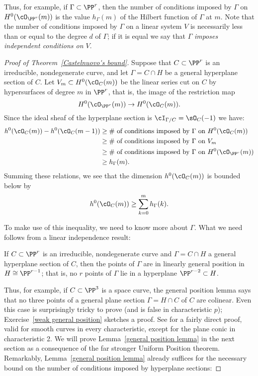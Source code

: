 Thus, for example, if $\Gamma \subset \PP^r$, then the number of conditions imposed by $\Gamma$ on $H^0(\cO_{\PP^r}(m))$ is the value $h_\Gamma(m)$ of the Hilbert function of $\Gamma$ at $m$.
Note that the number of conditions imposed by $\Gamma$ on a linear system $V$ is necessarily less than or equal to the degree $d$ of $\Gamma$; if it is equal we say that $\Gamma$ \emph{imposes independent conditions on $V$}.

\begin{proof}[Proof of Theorem~\ref{Castelnuovo's bound}]
Suppose that $C \subset \PP^r$ is an irreducible, nondegenerate curve, and let $\Gamma = C \cap H$ be a general hyperplane section of $C$. Let $V_m \subset H^0(\cO_C(m))$ be the linear series cut on $C$ by hypersurfaces of degree $m$ in $\PP^r$, that is, the image of the restriction map
$$
H^0(\cO_{\PP^r}(m)) \to H^0(\cO_C(m)).
$$
Since the ideal sheaf of the hyperplane section is $\cI_{\Gamma/C} = \sO_C(-1)$ we have:
\begin{align*}
h^0(\cO_C(m)) - h^0(\cO_C(m-1)) & \geq \text{\# of conditions imposed by $\Gamma$ on $H^0(\cO_C(m))$} \\
&\geq \text{\# of conditions imposed by $\Gamma$ on $V_m$} \\
&\geq \text{\# of conditions imposed by $\Gamma$ on $H^0(\cO_{\PP^r}(m))$} \\
&\geq h_\Gamma(m).
\end{align*}
Summing these relations, we see that the dimension $h^0(\cO_C(m))$ is bounded below by
$$
h^0(\cO_C(m)) \geq \sum_{k=0}^m h_\Gamma(k).
$$

 To make use of this inequality, we need to know more about $\Gamma$.
What we need follows from a linear independence result:

\begin{lemma}\label{general position lemma}
If $C \subset \PP^r$ is an irreducible, nondegenerate curve and $\Gamma = C \cap H$ a general hyperplane section of $C$, then the points of $\Gamma$ are in linearly general position in $H \cong \PP^{r-1}$; that is, no $r$ points of $\Gamma$ lie in a hyperplane $\PP^{r-2} \subset H$.
\end{lemma}


Thus, for example, if $C \subset \PP^3$ is a space curve, the general position lemma says that no three points of a general plane section $\Gamma = H \cap C$ of $C$ are colinear. Even this case is surprisingly tricky to prove (and is false in characteristic $p$); Exercise~\ref{weak general position} sketches a proof.
See \cite[Lemma 1.1]{Rathmann} for a fairly direct proof, valid for smooth curves in every characteristic, except for the plane conic in characteristic 2. We will prove Lemma~\ref{general position lemma} in the next section as a consequence of the far stronger Uniform Position theorem. Remarkably, Lemma~\ref{general position lemma} already suffices for the necessary bound on the number of conditions imposed by hyperplane sections:


\end{proof}
